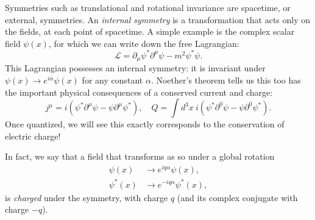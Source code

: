 Symmetries such as translational and rotational invariance are spacetime, or external, symmetries.
An \textit{internal symmetry} is a transformation that acts only on the fields, at each point of spacetime.
A simple example is the complex scalar field $\psi(x)$, 
for which we can write down the free Lagrangian:
\begin{equation}
	\label{eq:01_qft_symmetries_complex_lagrangian}
	\mathcal{L} = \partial_\mu\psi^*\partial^\mu\psi - m^2\psi^*\psi.
\end{equation}
This Lagrangian possesses an internal \UU[1] symmetry: it is invariant under $\psi(x) \rightarrow e^{i\alpha}\psi(x)$ for any constant $\alpha$.
Noether's theorem tells us this too has the important physical consequences of a conserved current and charge:
\begin{equation}
	\label{eq:01_qft_symmetries_u1_current_charge}
	j^\mu = i(\psi^*\partial^\mu\psi - \psi\partial^\mu\psi^*), \quad Q = \int d^3x\ i(\psi^*\partial^0\psi - \psi\partial^0\psi^*).
\end{equation}
Once quantized, we will see this exactly corresponds to the conservation of electric charge!

In fact, we say that a field that transforms as so under a global \UU[1] rotation
\begin{equation}
	\label{eq:01_qft_symmetries_u1_transformation}
	\begin{split}
		\psi(x) &\rightarrow e^{iq\alpha}\psi(x), \\
		\psi^*(x) &\rightarrow e^{-iq\alpha}\psi^*(x),
	\end{split}
\end{equation}
is \textit{charged} under the \UU[1] symmetry, with charge $q$ (and its complex conjugate with charge $-q$).

